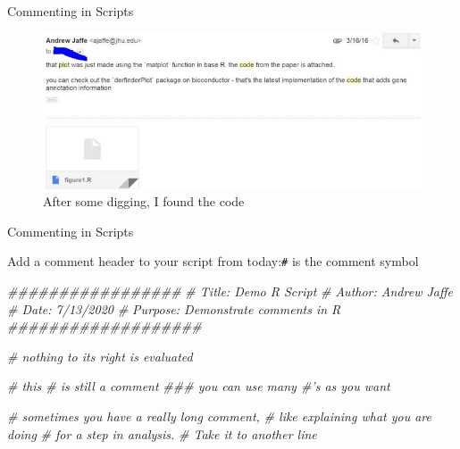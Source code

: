 \documentclass[
  ignorenonframetext,
]{beamer}
\newenvironment{Shaded}{\begin{snugshade}}{\end{snugshade}}
\newcommand{\CommentTok}[1]{\textcolor[rgb]{0.56,0.35,0.01}{\textit{#1}}}
\begin{document}
\begin{frame}{Commenting in Scripts}
\protect\hypertarget{commenting-in-scripts-3}{}

\begin{figure}
\centering
\includegraphics{media/code_fu.jpg}
\caption{After some digging, I found the code}
\end{figure}

\end{frame}

\begin{frame}[fragile]{Commenting in Scripts}
\protect\hypertarget{commenting-in-scripts-4}{}

Add a comment header to your script from today:\texttt{\#} is the
comment symbol

\begin{Shaded}
\begin{Highlighting}[]
\CommentTok{#################}
\CommentTok{# Title: Demo R Script}
\CommentTok{# Author: Andrew Jaffe}
\CommentTok{# Date: 7/13/2020}
\CommentTok{# Purpose: Demonstrate comments in R}
\CommentTok{###################}
 
\CommentTok{# nothing to its right is evaluated}

\CommentTok{# this # is still a comment}
\CommentTok{### you can use many #'s as you want}

\CommentTok{# sometimes you have a really long comment,}
\CommentTok{#    like explaining what you are doing }
\CommentTok{#    for a step in analysis. }
\CommentTok{# Take it to another line}
\end{Highlighting}
\end{Shaded}

\end{frame}
\end{document}
